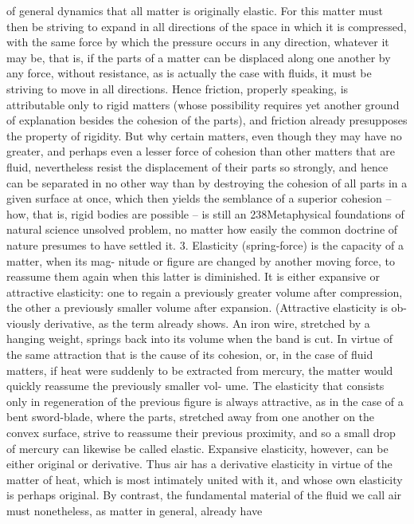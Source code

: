 of general dynamics that all matter is originally elastic. For this matter
must then be striving to expand in all directions of the space in which
it is compressed, with the same force by which the pressure occurs in
any direction, whatever it may be, that is, if the parts of a matter can
be displaced along one another by any force, without resistance, as is
actually the case with ﬂuids, it must be striving to move in all directions.
Hence friction, properly speaking, is attributable only to rigid matters
(whose possibility requires yet another ground of explanation besides the
cohesion of the parts), and friction already presupposes the property of
rigidity. But why certain matters, even though they may have no greater,
and perhaps even a lesser force of cohesion than other matters that are
ﬂuid, nevertheless resist the displacement of their parts so strongly, and
hence can be separated in no other way than by destroying the cohesion
of all parts in a given surface at once, which then yields the semblance
of a superior cohesion – how, that is, rigid bodies are possible – is still an
238Metaphysical foundations of natural science
unsolved problem, no matter how easily the common doctrine of nature
presumes to have settled it.
3. Elasticity (spring-force) is the capacity of a matter, when its mag-
nitude or ﬁgure are changed by another moving force, to reassume them again
when this latter is diminished. It is either expansive or attractive elasticity:
one to regain a previously greater volume after compression, the other
a previously smaller volume after expansion. (Attractive elasticity is ob-
viously derivative, as the term already shows. An iron wire, stretched by
a hanging weight, springs back into its volume when the band is cut.
In virtue of the same attraction that is the cause of its cohesion, or, in
the case of ﬂuid matters, if heat were suddenly to be extracted from
mercury, the matter would quickly reassume the previously smaller vol-
ume. The elasticity that consists only in regeneration of the previous
ﬁgure is always attractive, as in the case of a bent sword-blade, where
the parts, stretched away from one another on the convex surface, strive
to reassume their previous proximity, and so a small drop of mercury
can likewise be called elastic. Expansive elasticity, however, can be either
original or derivative. Thus air has a derivative elasticity in virtue of the
matter of heat, which is most intimately united with it, and whose own
elasticity is perhaps original. By contrast, the fundamental material of
the ﬂuid we call air must nonetheless, as matter in general, already have

